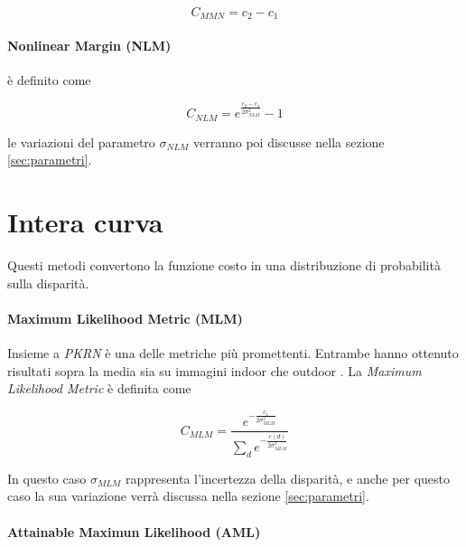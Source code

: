 \documentclass[12pt]{report}
\begin{document}
				\begin{equation}
					C_{MMN}=c_{2}-c_{1}
					\label{eq:MMN} 
				\end{equation} 	
				
			
			\paragraph{Nonlinear Margin (NLM)}
			\label{par:NLM}
			
				è definito come
				
				\begin{equation}
					C_{NLM}= e^{\frac{ c_{2}-c_{1}} {2\sigma_{NLM}^2}}-1
					\label{eq:NLM}
				\end{equation}
				
				\noindent le variazioni del parametro $\sigma_{NLM}$ verranno poi discusse nella sezione \ref{sec:parametri}.	
				
				
		\section{Intera curva}
		\label{sec:entireCost}
		
			Questi metodi convertono la funzione costo in una distribuzione di probabilità sulla disparità.
			
			\paragraph{Maximum Likelihood Metric (MLM)}
			\label{par:MLM}
			
				Insieme a \textit{PKRN} è una delle metriche più promettenti. Entrambe hanno ottenuto risultati sopra la media sia su immagini indoor che outdoor \cite{indoors_outdoors}.
				La \textit{Maximum Likelihood Metric} è definita come
				
				\begin{equation}
					C_{MLM}= \frac{e^{-\frac{c_{1}}{2\sigma_{MLM}^2}}}{\sum_{d} e^{-\frac{c(d)}{2\sigma_{MLM}^2}}}
					\label{eq:MLM}
				\end{equation}  	
			
				\noindent In questo caso $\sigma_{MLM}$ rappresenta l'incertezza della disparità, e anche per questo caso la sua variazione verrà discussa nella sezione \ref{sec:parametri}.
		
		
			\paragraph{Attainable Maximun Likelihood (AML)}
			\label{par:AML}
						
\end{document}
